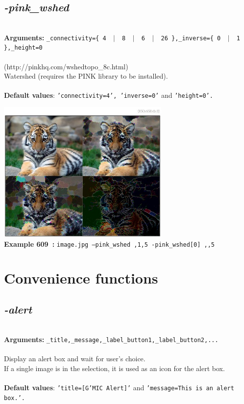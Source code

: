 \documentclass[a4paper,11pt,twoside]{book}
\begin{document}
\subsection{\emph{-pink\_wshed} }\vspace*{-0.5em}
~\\\textbf{Arguments: } 
{\small \texttt{\_connectivity=\{ 4 ~$|$~ 8 ~$|$~ 6 ~$|$~ 26 \},\_inverse=\{ 0 ~$|$~ 1 \},\_height=0}}\\~\\
(http://pinkhq.com/wshedtopo\_8c.html)
~\\Watershed (requires the PINK library to be installed).
~\\~\\\textbf{Default values}: {\small \texttt{'connectivity=4', 'inverse=0'} and \texttt{'height=0'.}}
\begin{center}\includegraphics[keepaspectratio=true,height=7cm,width=\textwidth]{img/gmic_def609.jpg}\\
{\footnotesize \textbf{Example 609~:} \texttt{image.jpg --pink\_wshed ,1,5 -pink\_wshed[0] ,,5}}
\end{center}
\section{Convenience functions}


\subsection{\emph{-alert} }\vspace*{-0.5em}
~\\\textbf{Arguments: } 
{\small \texttt{\_title,\_message,\_label\_button1,\_label\_button2,...}}\\~\\
Display an alert box and wait for user's choice.
~\\If a single image is in the selection, it is used as an icon for the alert box.
~\\~\\\textbf{Default values}: {\small \texttt{'title=[G'MIC Alert]'} and \texttt{'message=This is an alert box.'.}}
\end{document}
